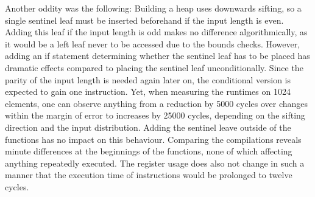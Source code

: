 Another oddity was the following:
Building a heap uses downwards sifting, so a single sentinel leaf must be inserted beforehand if the input length is even.
Adding this leaf if the input length is odd makes no difference algorithmically, as it would be a left leaf never to be accessed due to the bounds checks.
However, adding an if statement determining whether the sentinel leaf has to be placed has dramatic effects compared to placing the sentinel leaf unconditionally.
Since the parity of the input length is needed again later on, the conditional version is expected to gain one instruction.
Yet, when measuring the runtimes on 1024 elements, one can observe anything from a reduction by \num{5000} cycles over changes within the margin of error to increases by \num{25000} cycles, depending on the sifting direction and the input distribution.
Adding the sentinel leave outside of the \HS{} functions has no impact on this behaviour.
Comparing the compilations reveals minute differences at the beginnings of the \HS{} functions, none of which affecting anything repeatedly executed.
The register usage does also not change in such a manner that the execution time of instructions would be prolonged to twelve cycles.

